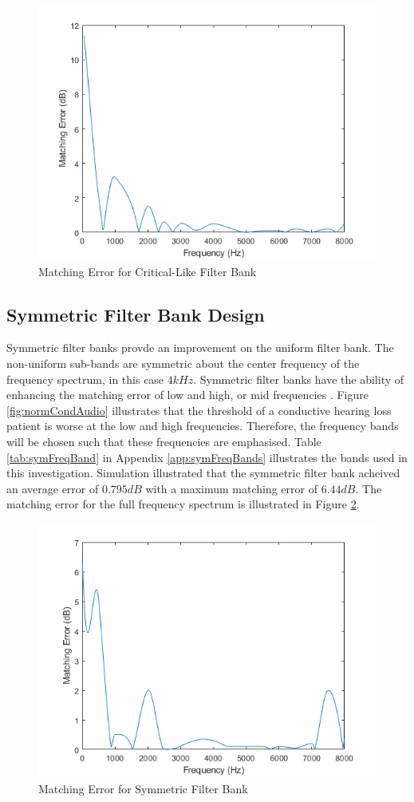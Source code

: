 \documentclass[12pt, onecolumn]{article}
\begin{document}
\begin{figure}[h]
\centering
\includegraphics[width=0.6\linewidth]{critMatErr.PNG}
\caption{Matching Error for Critical-Like Filter Bank}
\label{fig:critMatErr}
\end{figure}  


\subsection{Symmetric Filter Bank Design}
\label{sec:symmDesign}

\noindent Symmetric filter banks provde an improvement on the uniform filter bank. The non-uniform sub-bands are symmetric about the center frequency of the frequency spectrum, in this case $4kHz$. Symmetric filter banks have the ability of enhancing the matching error of low and high, or mid frequencies \cite{sebastian}. Figure \ref{fig:normCondAudio} illustrates that the threshold of a conductive hearing loss patient is worse at the low and high frequencies. Therefore, the frequency bands will be chosen such that these frequencies are emphasised. Table \ref{tab:symFreqBand} in Appendix \ref{app:symFreqBands} illustrates the bands used in this investigation. Simulation illustrated that the symmetric filter bank acheived an average error of $0.795dB$ with a maximum matching error of $6.44dB$.  The matching error for the full frequency spectrum is illustrated in Figure \ref{fig:symMatErr}.

\begin{figure}[h]
\centering
\includegraphics[width=0.6\linewidth]{symMatErr.PNG}
\caption{Matching Error for Symmetric Filter Bank}
\label{fig:symMatErr}
\end{figure}  
\end{document}
